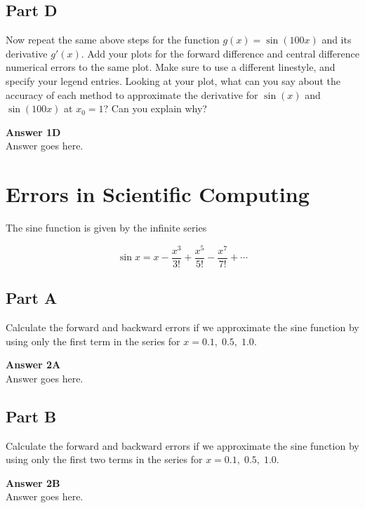 \documentclass{article}
\begin{document}
\subsection{Part D}

Now repeat the same above steps for the function $g(x) = \sin (100x)$ and its derivative $g'(x)$. Add your plots for the forward difference and central difference numerical errors to the same plot. Make sure to use a different linestyle, and specify your legend entries. Looking at your plot, what can you say about the accuracy of each method to approximate the derivative for $\sin (x)$ and $\sin (100x)$ at $x_{0} = 1$? Can you explain why?

\begin{framed}
\textbf{Answer 1D}\\
Answer goes here.
\end{framed}

\section{Errors in Scientific Computing}

The sine function is given by the infinite series

\begin{equation}
\sin x = x - \frac{x^3}{3!} + \frac{x^5}{5!} -\frac{x^7}{7!} + \cdots
\end{equation}

\subsection{Part A}

Calculate the forward and backward errors if we approximate the sine function by using only the first term in the series for $x = 0.1, \; 0.5, \; 1.0$.

\begin{framed}
\textbf{Answer 2A}\\
Answer goes here.
\end{framed}

\subsection{Part B}

Calculate the forward and backward errors if we approximate the sine function by using only the first two terms in the series for $x = 0.1, \; 0.5, \; 1.0$.

\begin{framed}
\textbf{Answer 2B}\\
Answer goes here.
\end{framed}
\end{document}
